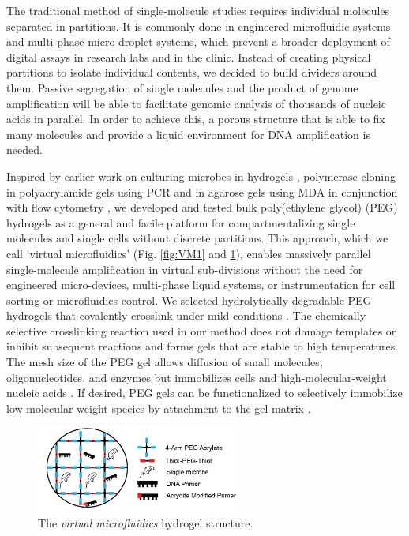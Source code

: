 The traditional method of single-molecule studies requires individual molecules separated in partitions. It is commonly done in engineered microfluidic systems and multi-phase micro-droplet systems, which prevent a broader deployment of digital assays in research labs and in the clinic. Instead of creating physical partitions to isolate individual contents, we decided to build  dividers around them. Passive segregation of single molecules and the product of genome amplification will be able to facilitate genomic analysis of thousands of nucleic acids in parallel. In order to achieve this, a porous structure that is able to fix many molecules and provide a liquid environment for DNA amplification is needed. 

Inspired by earlier work on culturing microbes in hydrogels \cite{Podar:2009ks}, polymerase cloning in polyacrylamide gels using PCR \cite{Mitra:1999ty} and in agarose gels using MDA in conjunction with flow cytometry \cite{Allen:2011jn}, we developed and tested bulk poly(ethylene glycol) (PEG) hydrogels as a general and facile platform for compartmentalizing single molecules and single cells without discrete partitions. This approach, which we call `virtual microfluidics' (Fig. \ref{fig:VM1} and \ref{fig:GelStructure}), enables massively parallel single-molecule amplification in virtual sub-divisions without the need for engineered micro-devices, multi-phase liquid systems, or instrumentation for cell sorting or microfluidics control. We selected hydrolytically degradable PEG hydrogels that covalently crosslink under mild conditions \cite{Raeber:2005cq}. The chemically selective crosslinking reaction used in our method does not damage templates or inhibit subsequent reactions and forms gels that are stable to high temperatures. The mesh size of the PEG gel allows diffusion of small molecules, oligonucleotides, and enzymes but immobilizes cells and high-molecular-weight nucleic acids \cite{Wu:2009ez}. If desired, PEG gels can be functionalized to selectively immobilize low molecular weight species by attachment to the gel matrix \cite{Phelps:2011dka}.

\begin{figure} 
\centering
\includegraphics[keepaspectratio,width=0.6\textwidth]{./figures/SolidPhaseWGA-21}
\caption[The \textit{virtual microfluidics} hydrogel structure.]{The \textit{virtual microfluidics} hydrogel structure.}
\label{fig:GelStructure}
\end{figure}

